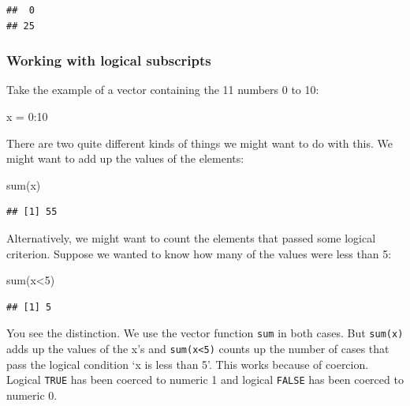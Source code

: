 \documentclass[
]{book}
\newenvironment{Shaded}{\begin{snugshade}}{\end{snugshade}}
\newcommand{\DecValTok}[1]{\textcolor[rgb]{0.00,0.00,0.81}{#1}}
\newcommand{\FunctionTok}[1]{\textcolor[rgb]{0.00,0.00,0.00}{#1}}
\newcommand{\NormalTok}[1]{#1}
\newcommand{\OtherTok}[1]{\textcolor[rgb]{0.56,0.35,0.01}{#1}}
\newcommand{\SpecialCharTok}[1]{\textcolor[rgb]{0.00,0.00,0.00}{#1}}
\begin{document}
\begin{verbatim}
##  0 
## 25
\end{verbatim}

\hypertarget{working-with-logical-subscripts}{%
\subsubsection{Working with logical subscripts}\label{working-with-logical-subscripts}}

Take the example of a vector containing the 11 numbers 0 to 10:

\begin{Shaded}
\begin{Highlighting}[]
\NormalTok{x }\OtherTok{=} \DecValTok{0}\SpecialCharTok{:}\DecValTok{10}
\end{Highlighting}
\end{Shaded}

There are two quite different kinds of things we might want to do with this. We might want to add up the values of the elements:

\begin{Shaded}
\begin{Highlighting}[]
\FunctionTok{sum}\NormalTok{(x)}
\end{Highlighting}
\end{Shaded}

\begin{verbatim}
## [1] 55
\end{verbatim}

Alternatively, we might want to count the elements that passed some logical criterion. Suppose we wanted to know how many of the values were less than 5:

\begin{Shaded}
\begin{Highlighting}[]
\FunctionTok{sum}\NormalTok{(x}\SpecialCharTok{\textless{}}\DecValTok{5}\NormalTok{)}
\end{Highlighting}
\end{Shaded}

\begin{verbatim}
## [1] 5
\end{verbatim}

You see the distinction. We use the vector function \texttt{sum} in both cases. But \texttt{sum(x)} adds up the values of the x's and \texttt{sum(x\textless{}5)} counts up the number of cases that pass the logical condition `x is less than 5'. This works because of coercion. Logical \texttt{TRUE} has been coerced to numeric 1 and logical \texttt{FALSE} has been coerced to numeric 0.
\end{document}
